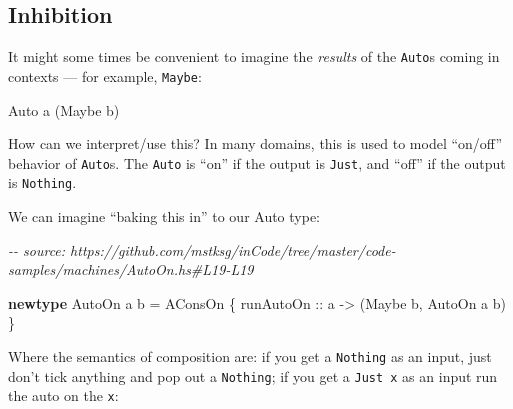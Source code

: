 \documentclass[]{article}
\newenvironment{Shaded}{}{}
\newcommand{\CommentTok}[1]{\textcolor[rgb]{0.38,0.63,0.69}{\textit{#1}}}
\newcommand{\DataTypeTok}[1]{\textcolor[rgb]{0.56,0.13,0.00}{#1}}
\newcommand{\KeywordTok}[1]{\textcolor[rgb]{0.00,0.44,0.13}{\textbf{#1}}}
\newcommand{\NormalTok}[1]{#1}
\newcommand{\OtherTok}[1]{\textcolor[rgb]{0.00,0.44,0.13}{#1}}
\begin{document}
\subsection{Inhibition}\label{inhibition}

It might some times be convenient to imagine the \emph{results} of the
\texttt{Auto}s coming in contexts --- for example, \texttt{Maybe}:

\begin{Shaded}
\begin{Highlighting}[]
\DataTypeTok{Auto}\NormalTok{ a (}\DataTypeTok{Maybe}\NormalTok{ b)}
\end{Highlighting}
\end{Shaded}

How can we interpret/use this? In many domains, this is used to model ``on/off''
behavior of \texttt{Auto}s. The \texttt{Auto} is ``on'' if the output is
\texttt{Just}, and ``off'' if the output is \texttt{Nothing}.

We can imagine ``baking this in'' to our Auto type:

\begin{Shaded}
\begin{Highlighting}[]
\CommentTok{{-}{-} source: https://github.com/mstksg/inCode/tree/master/code{-}samples/machines/AutoOn.hs\#L19{-}L19}

\KeywordTok{newtype} \DataTypeTok{AutoOn}\NormalTok{ a b }\OtherTok{=} \DataTypeTok{AConsOn}\NormalTok{ \{}\OtherTok{ runAutoOn ::}\NormalTok{ a }\OtherTok{{-}\textgreater{}}\NormalTok{ (}\DataTypeTok{Maybe}\NormalTok{ b, }\DataTypeTok{AutoOn}\NormalTok{ a b) \}}
\end{Highlighting}
\end{Shaded}

Where the semantics of composition are: if you get a \texttt{Nothing} as an
input, just don't tick anything and pop out a \texttt{Nothing}; if you get a
\texttt{Just\ x} as an input run the auto on the \texttt{x}:
\end{document}
